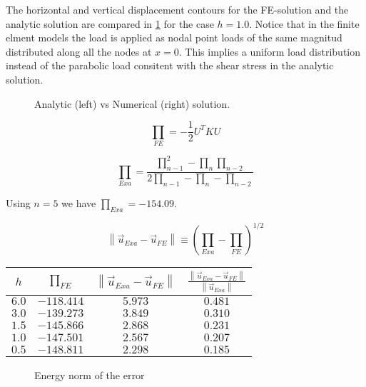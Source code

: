 \documentclass[12pt,letterpaper]{article}
\begin{document}
The horizontal and vertical displacement contours for the FE-solution and the analytic solution are compared in \cref{fig:sls} for the case $h=1.0$. Notice that in the finite elment models the load is applied as nodal point loads of the same magnitud distributed along all the nodes at $x=0$. This implies a uniform load distribution instead of the parabolic load consitent with the shear stress in the analytic solution.

\begin{figure}[H]
\centering
{}
\caption{Analytic (left) vs Numerical (right) solution.}
\label{fig:sls}
\end{figure}

\[{\prod _{FE}} =  - \frac{1}{2}{U^T}KU\]

\[{\prod _{Exa}} = \frac{{\prod _{n - 1}^2 - {\prod _n}{\prod _{n - 2}}}}{{2{\prod _{n - 1}} - {\prod _n} - {\prod _{n - 2}}}}\]

Using $n=5$ we have ${\prod _{Exa}}=-154.09$.

\[\left\| {{{\vec u}_{Exa}} - {{\vec u}_{FE}}} \right\| \equiv {({\prod _{Exa}} - {\prod _{FE}})^{1/2}}\]


\begin{center}
\begin{tabular}{ |c|c|c|c| }
  \hline
  $h$ & ${\prod _{FE}}$ & $\left\| {{{\vec u}_{Exa}} - {{\vec u}_{FE}}} \right\|$ & $\frac{{\left\| {{{\vec u}_{Exa}} - {{\vec u}_{FE}}} \right\|}}{{\left\| {{{\vec u}_{Exa}}} \right\|}}$ \\
  \hline 
  $6.0$  & $-118.414$ & $5.973$  & $0.481$  \\
  \hline
   $3.0$  & $-139.273$ & $3.849$  & $0.310$  \\
  \hline
   $1.5$  & $-145.866$ & $2.868$  & $0.231$  \\
  \hline
   $ 1.0$  & $-147.501$ & $2.567$  & $0.207$  \\
  \hline
  $ 0.5$  & $-148.811$ & $2.298$  & $0.185$  \\
  \hline
\end{tabular}
\label{ejemplo}
\end{center}

\begin{figure}[H]
\centering
{}
\caption{Energy norm of the error}
\label{fig:conv}
\end{figure}






\end{document}
